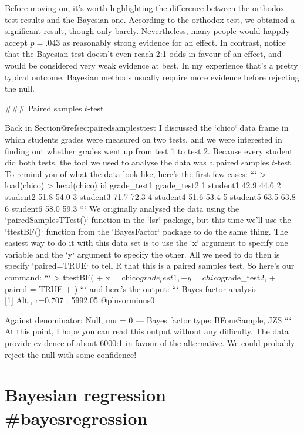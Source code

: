 Before moving on, it's worth highlighting the difference between the orthodox test results and the Bayesian one. According to the orthodox test, we obtained a significant result, though only barely. Nevertheless, many people would happily accept $p=.043$ as reasonably strong evidence for an effect. In contrast, notice that the Bayesian test doesn't even reach 2:1 odds in favour of an effect, and would be considered very weak evidence at best. In my experience that's a pretty typical outcome. Bayesian methods usually require more evidence before rejecting the null.

### Paired samples $t$-test

Back in Section@refsec:pairedsamplesttest I discussed the `chico` data frame in which students grades were measured on two tests, and we were interested in finding out whether grades went up from test 1 to test 2. Because every student did both tests, the tool we used to analyse the data was a paired samples $t$-test. To remind you of what the data look like, here's the first few cases:
```
> load(chico)
> head(chico)
        id grade_test1 grade_test2
1 student1        42.9        44.6
2 student2        51.8        54.0
3 student3        71.7        72.3
4 student4        51.6        53.4
5 student5        63.5        63.8
6 student6        58.0        59.3
```
We originally analysed the data using the `pairedSamplesTTest()` function in the `lsr` package, but this time we'll use the `ttestBF()` function from the `BayesFactor` package to do the same thing. The easiest way to do it with this data set is to use the `x` argument to specify one variable and the `y` argument to specify the other. All we need to do then is specify `paired=TRUE` to tell R that this is a paired samples test. So here's our command:
```
> ttestBF(
+    x = chico$grade_test1,
+    y = chico$grade_test2,
+    paired = TRUE
+ )
```
and here's the output:
```
Bayes factor analysis
--------------
[1] Alt., r=0.707 : 5992.05 @plusorminus0%

Against denominator:
  Null, mu = 0 
---
Bayes factor type: BFoneSample, JZS
```
At this point, I hope you can read this output without any difficulty. The data provide evidence of about 6000:1 in favour of the alternative. We could probably reject the null with some confidence!



\section{Bayesian regression {#bayesregression}}

